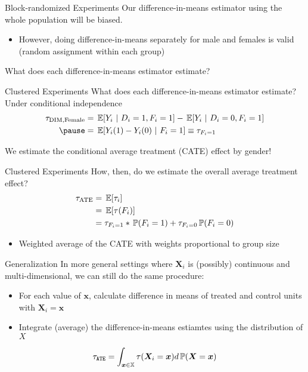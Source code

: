 \documentclass[aspectratio=169,t,11pt,table]{beamer}
\begin{document}
\begin{frame}{Block-randomized Experiments}
  Our difference-in-means estimator using the whole population will be biased.
  \begin{itemize}
    \item However, doing difference-in-means separately for male and females is valid (random assignment within each group)
  \end{itemize}

  \bigskip
  What does each difference-in-means estimator estimate?
\end{frame}

\begin{frame}{Clustered Experiments}
  What does each difference-in-means estimator estimate? Under conditional independence
  \begin{align*}
    \tau_{\text{DIM},\text{Female}} 
    &= \expec{Y_{i}}{D_i = 1, F_i = 1} - \expec{Y_{i}}{D_i = 0, F_i = 1}  \\ \pause
    &= \expec{Y_{i}(1) - Y_{i}(0)}{F_i = 1} \equiv \tau_{F_i = 1}
  \end{align*}

  \bigskip 
  We estimate the conditional average treatment (\alert{CATE}) effect by gender!
\end{frame}

\begin{frame}{Clustered Experiments}
  How, then, do we estimate the overall average treatment effect? 
  \begin{align*}
    \tau_{\text{ATE}} 
    &= \expec{\tau_i} \\
    &= \expec{\tau(F_i)} \\
    &= \tau_{F_i = 1} * \prob{F_i = 1} + \tau_{F_i = 0} \prob{F_i = 0}
  \end{align*}
  \begin{itemize}
    \item Weighted average of the CATE with weights proportional to group size
  \end{itemize}
\end{frame}

\begin{frame}{Generalization}
  In more general settings where $\bm{X}_i$ is (possibly) continuous and multi-dimensional, we can still do the same procedure:
  \begin{itemize}
    \item For each value of $\bm{x}$, calculate difference in means of treated and control units with $\bm{X}_i = \bm{x}$
    
    \item Integrate (average) the difference-in-means estiamtes using the distribution of $X$ 
  \end{itemize}

  \pause
  \vspace*{-\medskipamount}
  $$
    \tau_{\texttt{ATE}} = 
    \int_{\bm{x} \in \mathbb{X}} \tau(\bm{X}_i = \bm{x}) d\prob{\bm{X} = \bm{x}}
  $$
  
\end{frame}
\end{document}
